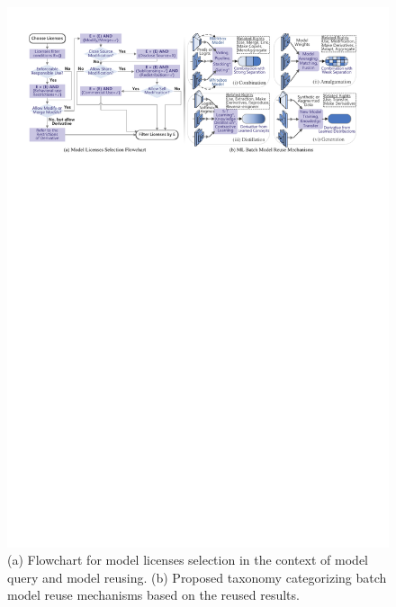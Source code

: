 \begin{figure}[t]
    \centering
    \includegraphics[width=\linewidth]{fig/flowchart.pdf}
    \caption{(a) Flowchart for model licenses selection in the context of model query and model reusing. (b) Proposed taxonomy categorizing batch model reuse mechanisms based on the reused results.}
    \label{fig:flowchart}
\end{figure}

